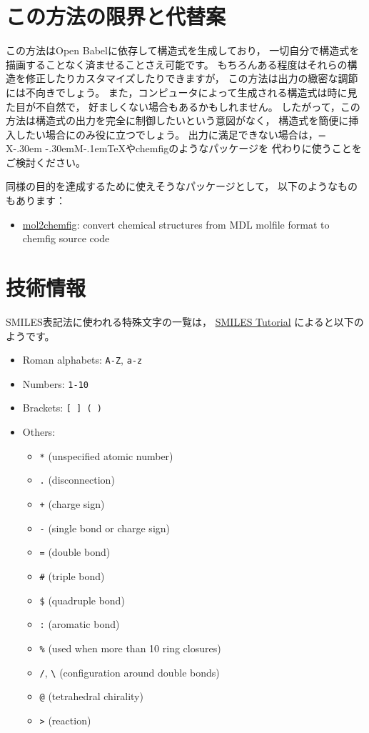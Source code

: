 \documentclass[12pt]{ltjsarticle}
\def\XyM{\ifnum\fam=-1\relax\fam=0\relax\fi\TestCount=\fam%
X\kern-.30em\smash{\raise.50ex\hbox{$\fam\TestCount\Upsilon$}}%
\kern-.30em{M}}
\def\XyMTeX{\XyM\kern-.1em\TeX}
\begin{document}
\clearpage

\section{この方法の限界と代替案}

この方法はOpen Babelに依存して構造式を生成しており，
一切自分で構造式を描画することなく済ませることさえ可能です。
もちろんある程度はそれらの構造を修正したりカスタマイズしたりできますが，
この方法は出力の緻密な調節には不向きでしょう。
また，コンピュータによって生成される構造式は時に見た目が不自然で，
好ましくない場合もあるかもしれません。
したがって，この方法は構造式の出力を完全に制御したいという意図がなく，
構造式を簡便に挿入したい場合にのみ役に立つでしょう。
出力に満足できない場合は，\XyMTeX や\textsf{chemfig}のようなパッケージを
代わりに使うことをご検討ください。

同様の目的を達成するために使えそうなパッケージとして，
以下のようなものもあります：
\begin{itemize}
  \item \href{http://www.ctan.org/pkg/mol2chemfig}{\textsf{mol2chemfig}}:
    convert chemical structures from MDL molfile format
    to \textsf{chemfig} source code
\end{itemize}

\clearpage

\section{技術情報}
\label{detail}

SMILES表記法に使われる特殊文字の一覧は，
\href{http://www.daylight.com/meetings/summerschool98/course/dave/smiles-intro.html}{SMILES Tutorial}%
によると以下のようです。
\begin{itemize}
\item Roman alphabets: \verb|A-Z|, \verb|a-z|
\item Numbers: \verb|1-10|
\item Brackets: \verb|[ ] ( )|
\item Others:
\begin{itemize}
\item \verb|*| (unspecified atomic number)
\item \verb|.| (disconnection)
\item \verb|+| (charge sign)
\item \verb|-| (single bond or charge sign)
\item \verb|=| (double bond)
\item \verb|#| (triple bond)
\item \verb|$| (quadruple bond)
\item \verb|:| (aromatic bond)
\item \verb|%| (used when more than 10 ring closures)
\item \verb|/|, \verb|\| (configuration around double bonds)
\item \verb|@| (tetrahedral chirality)
\item \verb|>| (reaction)
\end{itemize}
\end{itemize}
\end{document}
